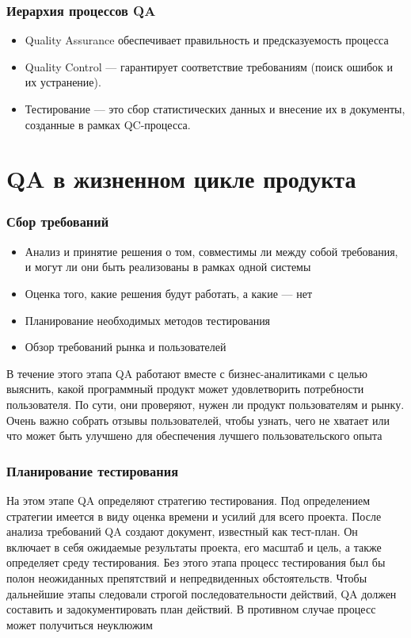 \documentclass{../industrial-development}
\begin{document}
	\begin{frame} \frametitle{Иерархия процессов QA}
		\begin{itemize}
			\item Quality Assurance обеспечивает правильность и предсказуемость процесса 
			
			\item Quality Control --- гарантирует соответствие требованиям (поиск ошибок и их устранение).
			
			\item Тестирование --- это сбор статистических данных и внесение их в документы, созданные в рамках QC-процесса.
		\end{itemize}
	\end{frame}
	
		
\section{QA в жизненном цикле продукта}
	\begin{frame} \frametitle{Сбор требований}
		\begin{itemize}
			\item Анализ и принятие решения о том, совместимы ли между собой требования, и могут ли они быть реализованы в рамках одной системы
			\item Оценка того, какие решения будут работать, а какие --- нет
			\item Планирование необходимых методов тестирования
			\item Обзор требований рынка и пользователей
		\end{itemize}
	\end{frame}
\lecturenotes
В течение этого этапа QA работают вместе с бизнес-аналитиками с целью выяснить, какой программный продукт может удовлетворить потребности пользователя. По сути, они проверяют, нужен ли продукт пользователям и рынку. Очень важно собрать отзывы пользователей, чтобы узнать, чего не хватает или что может быть улучшено для обеспечения лучшего пользовательского опыта
	
	\begin{frame} \frametitle{Планирование тестирования}
			На этом этапе QA определяют стратегию тестирования. Под определением стратегии имеется в виду оценка времени и усилий для всего проекта. После анализа требований QA создают документ, известный как тест-план. Он включает в себя ожидаемые результаты проекта, его масштаб и цель, а также определяет среду тестирования.
			Без этого этапа процесс тестирования был бы полон неожиданных препятствий и непредвиденных обстоятельств. Чтобы дальнейшие этапы следовали строгой последовательности действий, QA должен составить и задокументировать план действий. В противном случае процесс может получиться неуклюжим
	\end{frame}
	
\end{document}
